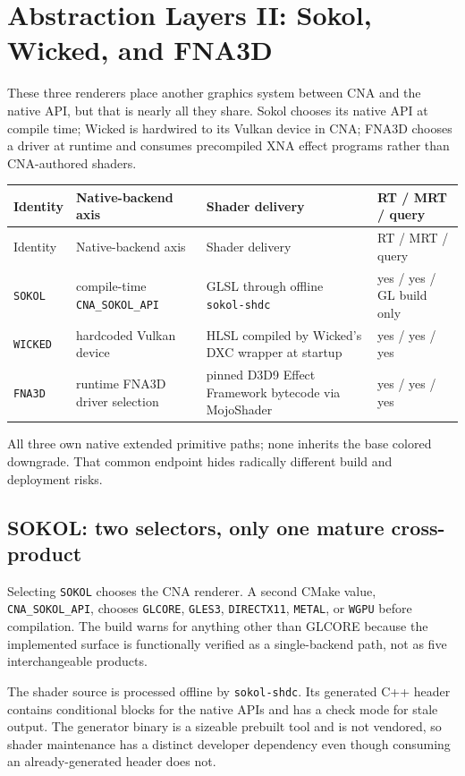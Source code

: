 \chapter{Abstraction Layers II: Sokol, Wicked, and FNA3D}
\label{ch:abstraction-layers-two}

These three renderers place another graphics system between CNA and the native API, but that
is nearly all they share.  Sokol chooses its native API at compile time; Wicked is hardwired
to its Vulkan device in CNA; FNA3D chooses a driver at runtime and consumes precompiled XNA
effect programs rather than CNA-authored shaders.

\begin{longtable}{p{}p{}p{}p{}}
\toprule
Identity & Native-backend axis & Shader delivery & RT / MRT / query \\
\midrule
\endfirsthead
\toprule
Identity & Native-backend axis & Shader delivery & RT / MRT / query \\
\midrule
\endhead
\texttt{SOKOL} & compile-time \texttt{CNA\_SOKOL\_API} & GLSL through offline \texttt{sokol-shdc} & yes / yes / GL build only \\
\texttt{WICKED} & hardcoded Vulkan device & HLSL compiled by Wicked's DXC wrapper at startup & yes / yes / yes \\
\texttt{FNA3D} & runtime FNA3D driver selection & pinned D3D9 Effect Framework bytecode via MojoShader & yes / yes / yes \\
\bottomrule
\end{longtable}

All three own native extended primitive paths; none inherits the base colored downgrade.  That
common endpoint hides radically different build and deployment risks.

\section{SOKOL: two selectors, only one mature cross-product}

Selecting \texttt{SOKOL} chooses the CNA renderer.  A second CMake value,
\texttt{CNA\_SOKOL\_API}, chooses \texttt{GLCORE}, \texttt{GLES3},
\texttt{DIRECTX11}, \texttt{METAL}, or \texttt{WGPU} before compilation.  The build warns for
anything other than GLCORE because the implemented surface is functionally verified as a
single-backend path, not as five interchangeable products.

The shader source is processed offline by \texttt{sokol-shdc}.  Its generated C++ header
contains conditional blocks for the native APIs and has a check mode for stale output.  The
generator binary is a sizeable prebuilt tool and is not vendored, so shader maintenance has a
distinct developer dependency even though consuming an already-generated header does not.

